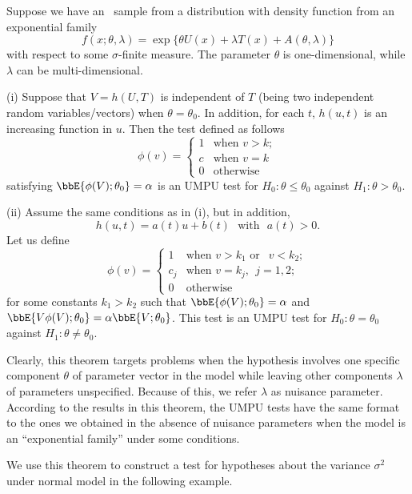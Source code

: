 \begin{theorem}
\label{thm19.1}
Suppose we have an \iid\ sample from a distribution with density
function from an exponential family
\[
f(x; \theta, \lambda) 
=
\exp\{ \theta U(x) + \lambda T(x) + A(\theta, \lambda) \}
\]
with respect to some $\sigma$-finite measure.
The parameter $\theta$ is one-dimensional, while
$\lambda$ can be multi-dimensional. 

\vs
\noindent
(i) Suppose that $V = h(U, T)$ is independent of $T$ (being two independent random variables/vectors)
when $\theta = \theta_0$. In addition, for each $t$, $h(u, t)$ is an increasing
function in $u$. Then the test defined as follows
\[
\phi(v) =
\left \{
\begin{array}{ll}
1 &  \mbox{when  }  v > k;\\
c &  \mbox{when  }  v = k
\\
0 & \mbox{otherwise}
\end{array}
\right .
\] 
satisfying $\bbE\{ \phi(V); \theta_0 \} = \alpha$
is an UMPU test for $H_0: \theta \leq \theta_0$ against
$H_1: \theta > \theta_0$.

\vs
\noindent
(ii) Assume the same conditions as in (i), but in addition,
\[
h(u, t) = a(t)u + b(t) ~~~\mbox{with}~~~ a(t) > 0.
\]
Let us define
\[
\phi(v) =
\left \{
\begin{array}{ll}
1 &  \mbox{when  }  v > k_1 \mbox{ or }~~ v < k_2;
\\
c_j &  \mbox{when  }  v = k_j, ~~j=1, 2;
\\
0 & \mbox{otherwise}
\end{array}
\right .
\] 
for some constants $k_1 > k_2$ such that $\bbE\{ \phi(V); \theta_0 \} = \alpha$
and $\bbE\{V \phi(V); \theta_0 \} = \alpha \bbE\{V; \theta_0 \}$.
This test is an UMPU test for $H_0: \theta = \theta_0$ against
$H_1: \theta \neq \theta_0$.
\end{theorem}

Clearly, this theorem targets problems
when the hypothesis involves one specific component $\theta$ of parameter
vector in the model while leaving other components $\lambda$ of parameters
unspecified. Because of this, we refer  $\lambda$ as nuisance parameter.
According to the results in this theorem, the UMPU tests have the
same format to the ones we obtained in the absence of nuisance parameters
when the model is an ``exponential family'' under some conditions.

We use this theorem to construct
a test for hypotheses about the variance $\sigma^2$
under normal model in the following example.

